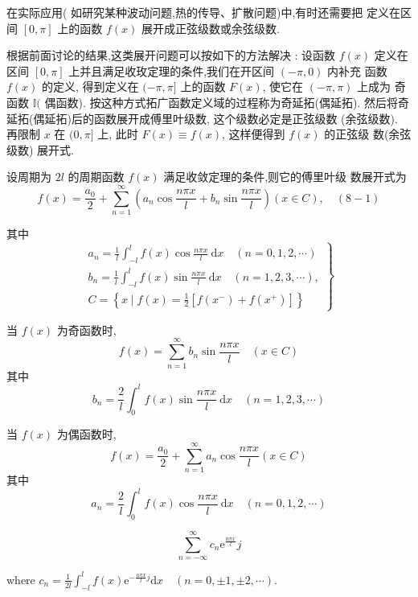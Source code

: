在实际应用( 如研究某种波动问题,热的传导、扩散问题)中,有时还需要把 定义在区间 $ [0, \pi] $ 上的函数 $ f(x) $ 展开成正弦级数或余弦级数.

根据前面讨论的结果,这类展开问题可以按如下的方法解决 : 设函数 $ f(x) $ 定义在区间 $ [0, \pi] $ 上并且满足收玫定理的条件,我们在开区间 $ (-\pi, 0) $ 内补充 函数 $ f(x) $ 的定义, 得到定义在 $ (-\pi, \pi] $ 上的函数 $ F(x) $, 使它在 $ (-\pi, \pi) $ 上成为 奇函数 $ \mathbb{I}( $ 偶函数). 按这种方式拓广函数定义域的过程称为奇延拓(偶延拓). 然后将奇延拓(偶延拓)后的函数展开成傅里叶级数, 这个级数必定是正弦级数 (余弦级数). 再限制 $ x $ 在 $ (0, \pi] $ 上, 此时 $ F(x) \equiv f(x) $, 这样便得到 $ f(x) $ 的正弦级 数(余弦级数) 展开式.


\begin{theorem}
    设周期为 $ 2 l $ 的周期函数 $ f(x) $ 满足收敛定理的条件,则它的傅里叶级 数展开式为
$$
f(x)=\frac{a_{0}}{2}+\sum_{n=1}^{\infty}\left(a_{n} \cos \frac{n \pi x}{l}+b_{n} \sin \frac{n \pi x}{l}\right)(x \in C), \quad(8-1)
$$

其中
$$
\left.\begin{array}{l}
a_{n}=\frac{1}{l} \int_{-l}^{l} f(x) \cos \frac{n \pi x}{l} \mathrm{~d} x \quad(n=0,1,2, \cdots) \\
b_{n}=\frac{1}{l} \int_{-l}^{l} f(x) \sin \frac{n \pi x}{l} \mathrm{~d} x \quad(n=1,2,3, \cdots), \\
C=\left\{x \mid f(x)=\frac{1}{2}\left[f\left(x^{-}\right)+f\left(x^{+}\right)\right]\right\}
\end{array}\right\}
$$



当 $ f(x) $ 为奇函数时,
$$
f(x)=\sum_{n=1}^{\infty} b_{n} \sin \frac{n \pi x}{l} \quad(x \in C)
$$
其中
$$
b_{n}=\frac{2}{l} \int_{0}^{l} f(x) \sin \frac{n \pi x}{l} \mathrm{~d} x \quad(n=1,2,3, \cdots)
$$

当 $ f(x) $ 为偶函数时,
$$
f(x)=\frac{a_{0}}{2}+\sum_{n=1}^{\infty} a_{n} \cos \frac{n \pi x}{l}(x \in C)
$$
其中
$$
a_{n}=\frac{2}{l} \int_{0}^{l} f(x) \cos \frac{n \pi x}{l} \mathrm{~d} x \quad(n=0,1,2, \cdots)
$$
\end{theorem}

\begin{definition}[傅里叶级数的复数形式]
    $$ \sum_{n=-\infty}^{\infty} c_{n} \mathrm{e}^{\frac{n \pi x}{l}}j $$

    where $c_{n}=\frac{1}{2 l} \int_{-l}^{l} f(x) \mathrm{e}^{-\frac{n \pi x}{l} j} \mathrm{d} x \quad(n=0, \pm 1, \pm 2, \cdots) $.
\end{definition}

